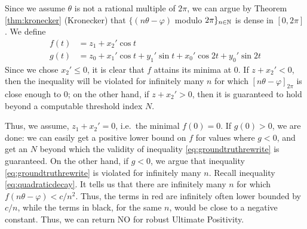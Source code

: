 Since we assume $\theta$ is not a rational multiple of $2\pi$, we can argue by Theorem \ref{thm:kronecker} (Kronecker) that $\{(n\theta - \varphi)$ modulo ${2\pi}\}_{n\in\mathbb{N}}$ is dense in $[0, 2\pi]$. 
We define 
\begin{align}
f(t) &= z_1 + x_2'\cos t  \\
g(t) &= z_0 + x_1'\cos t + y_1'\sin t + x_0'\cos 2t + y_0'\sin 2t
\end{align}
Since we chose $x_2' \le 0$, it is clear that $f$ attains its minima at $0$. If $z + x_2' < 0$, then the inequality will be violated for infinitely many $n$ for which $[n\theta - \varphi]_{2\pi}$ is close enough to $0$; on the other hand, if $z + x_2' > 0$, then it is guaranteed to hold beyond a computable threshold index $N$.

Thus, we assume, $z_1 + x_2' = 0$, i.e.\ the minimal $f(0) = 0$. If $g(0) > 0$, we are done: we can easily get a positive lower bound on $f$ for values where $g < 0$, and get an $N$ beyond which the validity of inequality \ref{eq:groundtruthrewrite} is guaranteed. On the other hand, if $g < 0$, we argue that inequality \ref{eq:groundtruthrewrite} is violated for infinitely many $n$. Recall inequality \ref{eq:quadraticdecay}. It tells us that there are infinitely many $n$ for which $f(n\theta - \varphi) < c/n^2$. Thus, the terms in red are infinitely often lower bounded by $c/n$, while the terms in black, for the same $n$, would be close to a negative constant. Thus, we can return NO for robust Ultimate Positivity.

